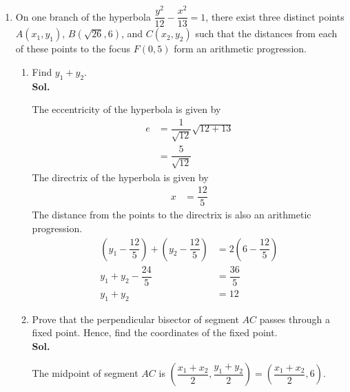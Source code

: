 \documentclass{report}
\newcommand{\sol}{\vspace{1em}\\\textbf{Sol.}}
\begin{document}
\begin{enumerate}
    \item On one branch of the hyperbola $\dfrac{y^2}{12} - \dfrac{x^2}{13} = 1$, there
          exist three distinct points $A(x_1, y_1)$, $B(\sqrt{26}, 6)$, and $C(x_2, y_2)$
          such that the distances from each of these points to the focus $F(0,5)$ form an
          arithmetic progression.
          \begin{enumerate}
              \item Find $y_1+y_2$. \sol{}

                    The eccentricity of the hyperbola is given by
                    \begin{align*}
                        e & = \dfrac{1}{\sqrt{12}}\sqrt{12 + 13} \\
                          & = \dfrac{5}{\sqrt{12}}
                    \end{align*}
                    The directrix of the hyperbola is given by
                    \begin{align*}
                        x & = \dfrac{12}{5}
                    \end{align*}
                    The distance from the points to the directrix is also an arithmetic progression.
                    \begin{align*}
                        \left(y_1 - \dfrac{12}{5}\right) + \left(y_2 - \dfrac{12}{5}\right) & = 2\left(6 - \dfrac{12}{5}\right) \\
                        y_1 + y_2 - \dfrac{24}{5}                                           & = \dfrac{36}{5}                   \\
                        y_1 + y_2                                                           & = 12
                    \end{align*}

              \item Prove that the perpendicular bisector of segment $AC$ passes through a fixed
                    point. Hence, find the coordinates of the fixed point. \sol{}

                    The midpoint of segment $AC$ is $\left(\dfrac{x_1 + x_2}{2}, \dfrac{y_1 +
                            y_2}{2}\right) = \left(\dfrac{x_1 + x_2}{2}, 6\right)$.


\end{enumerate}
\end{enumerate}
\end{document}
